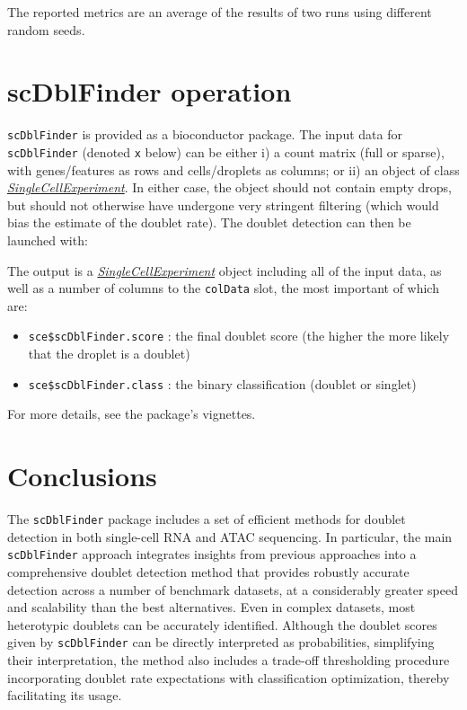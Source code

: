 \documentclass[10pt,a4paper,twocolumn]{article}
\begin{document}
The reported metrics are an average of the results of two runs using different random seeds.

\section{scDblFinder operation}

\texttt{scDblFinder} is provided as a bioconductor package.
The input data for \texttt{scDblFinder} (denoted \texttt{x} below) can be either
i) a count matrix (full or sparse), with genes/features as rows and cells/droplets as columns; or
ii) an object of class \emph{\href{https://bioconductor.org/packages/3.13/SingleCellExperiment}{SingleCellExperiment}}.
In either case, the object should not contain empty drops, but should not otherwise have undergone very stringent filtering (which would bias the estimate of the doublet rate). The doublet detection can then be launched with:

\begin{Shaded}
\begin{Highlighting}[]
\OtherTok{\textless{}{-}} 
\end{Highlighting}
\end{Shaded}

The output is a \emph{\href{https://bioconductor.org/packages/3.13/SingleCellExperiment}{SingleCellExperiment}} object including all of the input data, as well as a number of columns to the \texttt{colData} slot, the most important of which are:

\begin{itemize}
\tightlist
\item
  \texttt{sce\$scDblFinder.score} : the final doublet score (the higher the more likely that the droplet is a doublet)
\item
  \texttt{sce\$scDblFinder.class} : the binary classification (doublet or singlet)
\end{itemize}

For more details, see the package's vignettes.

\section{Conclusions}

The \texttt{scDblFinder} package includes a set of efficient methods for doublet detection in both single-cell RNA and ATAC sequencing. In particular, the main \texttt{scDblFinder} approach integrates insights from previous approaches into a comprehensive doublet detection method that provides robustly accurate detection across a number of benchmark datasets, at a considerably greater speed and scalability than the best alternatives. Even in complex datasets, most heterotypic doublets can be accurately identified. Although the doublet scores given by \texttt{scDblFinder} can be directly interpreted as probabilities, simplifying their interpretation, the method also includes a trade-off thresholding procedure incorporating doublet rate expectations with classification optimization, thereby facilitating its usage.
\end{document}
